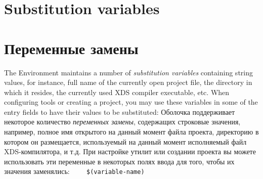 \ifenglish
\section{Substitution variables}
\else
\section{Переменные замены}
\fi
\label{variables}

\ifenglish
The Environment maintains a number of {\em substitution variables}
containing string values, for instance, full name of the
currently open project file, the directory in which it resides, the
currently used XDS compiler executable, etc. When configuring
tools or creating a project, you may use these variables in some of
the entry fields to have their values to be substituted:
\else
Оболочка поддерживает некоторое количество {\em переменных замены},
содержащих строковые значения, например, полное имя открытого на данный 
момент файла проекта, директорию в котором он размещается, используемый
на данный момент исполняемый файл XDS-компилятора, и т.д. При настройке
утилит или создании проекта вы можете использовать эти переменные в 
некоторых полях ввода для того, чтобы их значения заменялись: 
\fi
\verb'    $(variable-name)'

